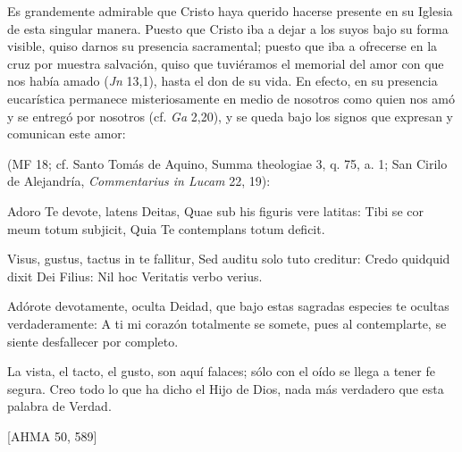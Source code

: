 \begin{ccebody}
 Es grandemente admirable que Cristo haya querido hacerse presente en su Iglesia de esta singular manera. Puesto que Cristo iba a dejar a los suyos bajo su forma visible, quiso darnos su presencia sacramental; puesto que iba a ofrecerse en la cruz por muestra salvación, quiso que tuviéramos el memorial del amor con que nos había amado  (\textit{Jn} 13,1), hasta el don de su vida. En efecto, en su presencia eucarística permanece misteriosamente en medio de nosotros como quien nos amó y se entregó por nosotros (cf. \textit{Ga} 2,20), y se queda bajo los signos que expresan y comunican este amor:


  (MF 18; cf. Santo Tomás de Aquino, Summa theologiae 3, q. 75, a. 1; San Cirilo de Alejandría, \textit{Commentarius in Lucam} 22, 19):


\newpage
\begin{cceprose}
Adoro Te devote, latens Deitas,
   Quae sub his figuris vere latitas:
   Tibi se cor meum totum subjicit,
   Quia Te contemplans totum deficit.

Visus, gustus, tactus in te fallitur,
   Sed auditu solo tuto creditur:
   Credo quidquid dixit Dei Filius:
   Nil hoc Veritatis verbo verius.

Adórote devotamente, oculta Deidad,
   que bajo estas sagradas especies te ocultas verdaderamente:
   A ti mi corazón totalmente se somete,
   pues al contemplarte, se siente desfallecer por completo.

La vista, el tacto, el gusto, son aquí falaces;
   sólo con el oído se llega a tener fe segura.
   Creo todo lo que ha dicho el Hijo de Dios,
   nada más verdadero que esta palabra de Verdad. 

[AHMA 50, 589]
\end{cceprose}
\end{ccebody}


